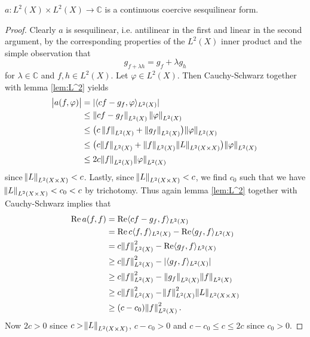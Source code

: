 \begin{enumerate}[label = \textbf{Exercise \arabic*.},wide = 0pt, itemsep = 1.5ex]
		\begin{lemma}
			$a : L^2(X) \times L^2(X) \to \mathbb{C}$ is a continuous coercive sesquilinear form.
		\end{lemma}

		\begin{proof}
			Clearly $a$ is sesquilinear, i.e. antilinear in the first and linear in the second argument, by the corresponding properties of the $L^2(X)$ inner product and the simple observation that
			\begin{equation*}
				g_{f + \lambda h} = g_f + \lambda g_h
			\end{equation*}
			\noindent for $\lambda \in \mathbb{C}$ and $f,h \in L^2(X)$. Let $\varphi \in L^2(X)$. Then Cauchy-Schwarz together with lemma \ref{lem:L^2} yields
			\begin{align*}
				\abs{a(f,\varphi)} &= \abs[0]{\langle cf - g_f,\varphi \rangle_{L^2(X)}}\\
				&\leq \norm[0]{cf - g_f}_{L^2(X)}\norm[0]{\varphi}_{L^2(X)}\\
				&\leq \del[1]{c\norm[0]{f}_{L^2(X)} + \norm[0]{g_f}_{L^2(X)}}\norm{\varphi}_{L^2(X)}\\
				&\leq \del[1]{c\norm{f}_{L^2(X)} + \norm[0]{f}_{L^2(X)}\norm{L}_{L^2(X \times X)}} \norm{\varphi}_{L^2(X)}\\
				&\leq 2c\norm{f}_{L^2(X)}\norm{\varphi}_{L^2(X)} 
			\end{align*}
			\noindent since $\norm{L}_{L^2(X \times X)} < c$. Lastly, since $\norm{L}_{L^2(X \times X)} < c$, we find $c_0$ such that we have $\norm{L}_{L^2(X \times X)} < c_0 < c$ by trichotomy. Thus again lemma \ref{lem:L^2} together with Cauchy-Schwarz implies that 
			\begin{align*}
				\Re a(f,f) &= \Re \langle cf - g_f,f \rangle_{L^2(X)}\\
				&= \Re c\langle f,f \rangle_{L^2(X)} - \Re \langle g_f,f\rangle_{L^2(X)}\\
				&= c\norm{f}_{L^2(X)}^2 - \Re \langle g_f,f\rangle_{L^2(X)}\\
				&\geq c\norm{f}_{L^2(X)}^2 - \abs[0]{\langle g_f,f \rangle_{L^2(X)}}\\
				&\geq c \norm{f}_{L^2(X)}^2 - \norm[0]{g_f}_{L^2(X)}\norm{f}_{L^2(X)}\\
				&\geq c \norm{f}_{L^2(X)}^2 - \norm{f}_{L^2(X)}^2 \norm{L}_{L^2(X \times X)}\\
				&\geq (c  -c_0)\norm{f}_{L^2(X)}^2.
			\end{align*}
			Now $2c > 0$ since $c > \norm{L}_{L^2(X \times X)}$, $c - c_0 > 0$ and $c - c_0 \leq c \leq 2c$ since $c_0 > 0$.
		\end{proof}


\end{enumerate}
